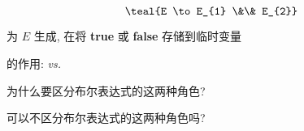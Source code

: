 \begin{frame}{}
  \begin{center}
    \vspace{-0.50cm}
    \[
      \teal{E \to E_{1} \&\& E_{2}}
    \]

    为 $E$ 生成,
    在将 {\bf true} 或 {\bf false} 存储到临时变量
  \end{center}
\end{frame}

\begin{frame}{}
  \begin{center}

  \end{center}
\end{frame}

\begin{frame}{}
  \begin{center}
    {\Large {}的作用:  \emph{vs.} }

    \vspace{0.50cm}

    \pause
    \vspace{0.80cm}
    为什么要区分布尔表达式的这两种角色?

    \pause
    \vspace{0.80cm}
    可以不区分布尔表达式的这两种角色吗?
  \end{center}
\end{frame}
